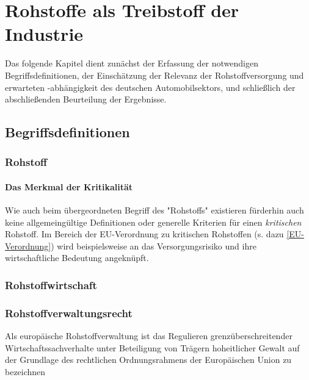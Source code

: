 \documentclass[12pt,a4paper,oneside]{book} %
\begin{document}
	
	
	\chapter{Rohstoffe als Treibstoff der Industrie}
	
	Das folgende Kapitel dient zunächst der Erfassung der notwendigen Begriffsdefinitionen, der Einschätzung der Relevanz der Rohstoffversorgung und erwarteten -abhängigkeit des deutschen Automobilsektors, und schließlich der abschließenden Beurteilung der Ergebnisse.
	
	\section{Begriffsdefinitionen}
	
	\subsection{Rohstoff}
	
	
	\subsubsection{Das Merkmal der Kritikalität}
	Wie auch beim übergeordneten Begriff des "Rohstoffs" existieren fürderhin auch keine allgemeingültige Definitionen oder generelle Kriterien für einen \textit{kritischen} Rohstoff. Im Bereich der EU-Verordnung zu kritischen Rohstoffen (s. dazu \ref{EU-Verordnung}) wird beispielsweise an das Versorgungsrisiko und ihre wirtschaftliche Bedeutung angeknüpft.
	
	\subsection{Rohstoffwirtschaft}
	
	\subsection{Rohstoffverwaltungsrecht}
	
	
	\glqq Als europäische Rohstoffverwaltung ist das Regulieren grenzüberschreitender Wirtschaftssachverhalte unter Beteiligung von Trägern hoheitlicher Gewalt auf der Grundlage des rechtlichen Ordnungsrahmens der Europäischen Union zu bezeichnen\grqq \autocite{Schorkopf, Europäische Rohstoffverwaltung, Rn. 2}
	
\end{document}
